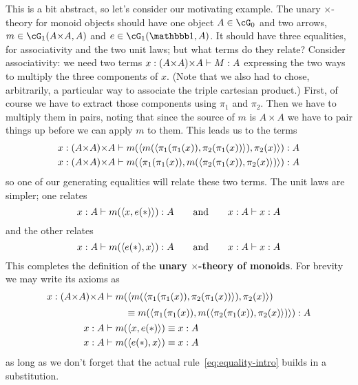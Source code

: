 This is a bit abstract, so let's consider our motivating example.
The unary $\times$-theory for monoid objects should have one object $A\in\cG_0$ and two arrows, $m\in \cG_1(A\times A,A)$ and $e\in\cG_1(\unit,A)$.
It should have three equalities, for associativity and the two unit laws; but what terms do they relate?
Consider associativity: we need two terms $x:(A\times A)\times A \types M:A$ expressing the two ways to multiply the three components of $x$.
(Note that we also had to chose, arbitrarily, a particular way to associate the triple cartesian product.)
First, of course we have to extract those components using $\pi_1$ and $\pi_2$.
Then we have to multiply them in pairs, noting that since the source of $m$ is $A\times A$ we have to pair things up before we can apply $m$ to them.
This leads us to the terms
\begin{align*}
  x:(A\times A)\times A &\types m(\pair{m(\pair{\pi_1(\pi_1(x))}{\pi_2(\pi_1(x))})}{\pi_2(x)}) : A\\
  x:(A\times A)\times A &\types m(\pair{\pi_1(\pi_1(x))}{m(\pair{\pi_2(\pi_1(x))}{\pi_2(x)})}) : A
\end{align*}
so one of our generating equalities will relate these two terms.
The unit laws are simpler; one relates
\[ x:A \vdash m(\langle x,e(\mathord{\ast})\rangle):A \qquad\text{and}\qquad x:A \vdash x:A \]
and the other relates
\[ x:A \vdash m(\langle e(\mathord{\ast}),x\rangle):A \qquad\text{and}\qquad x:A \vdash x:A \]
This completes the definition of the \textbf{unary $\times$-theory of monoids}.
For brevity we may write its axioms as
\begin{align*}
  x:(A\times A)\times A &\types
                          \begin{multlined}[t]
                            m(\pair{m(\pair{\pi_1(\pi_1(x))}{\pi_2(\pi_1(x))})}{\pi_2(x)}) \\[\jot]
                            \equiv
                            m(\pair{\pi_1(\pi_1(x))}{m(\pair{\pi_2(\pi_1(x))}{\pi_2(x)})}) : A
                          \end{multlined}\\
  x:A &\types m(\pair{x}{e(\ttt)}) \equiv x:A\\
  x:A &\types m(\pair{e(\ttt)}{x}) \equiv x:A
\end{align*}
as long as we don't forget that the actual rule~\eqref{eq:equality-intro} builds in a substitution.

